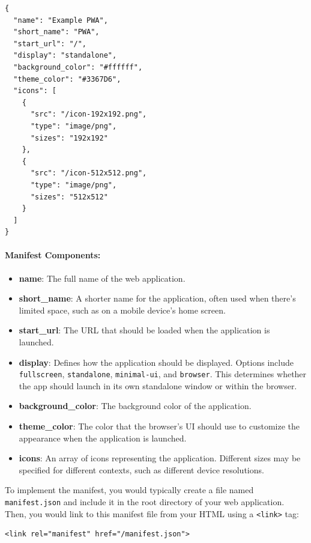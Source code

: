 \documentclass[12pt,a4paper]{article}
\begin{document}
\begin{verbatim}
{
  "name": "Example PWA",
  "short_name": "PWA",
  "start_url": "/",
  "display": "standalone",
  "background_color": "#ffffff",
  "theme_color": "#3367D6",
  "icons": [
    {
      "src": "/icon-192x192.png",
      "type": "image/png",
      "sizes": "192x192"
    },
    {
      "src": "/icon-512x512.png",
      "type": "image/png",
      "sizes": "512x512"
    }
  ]
}
\end{verbatim}

\paragraph{Manifest Components:}

\begin{itemize}
    \item \textbf{name}: The full name of the web application.
    \item \textbf{short\_name}: A shorter name for the application, often used when there's limited space, such as on a mobile device's home screen.
    \item \textbf{start\_url}: The URL that should be loaded when the application is launched.
    \item \textbf{display}: Defines how the application should be displayed. Options include \texttt{fullscreen}, \texttt{standalone}, \texttt{minimal-ui}, and \texttt{browser}. This determines whether the app should launch in its own standalone window or within the browser.
    \item \textbf{background\_color}: The background color of the application.
    \item \textbf{theme\_color}: The color that the browser's UI should use to customize the appearance when the application is launched.
    \item \textbf{icons}: An array of icons representing the application. Different sizes may be specified for different contexts, such as different device resolutions.
\end{itemize}

To implement the manifest, you would typically create a file named \texttt{manifest.json} and include it in the root directory of your web application. Then, you would link to this manifest file from your HTML using a \texttt{<link>} tag:

\begin{verbatim}
<link rel="manifest" href="/manifest.json">
\end{verbatim}
\end{document}
